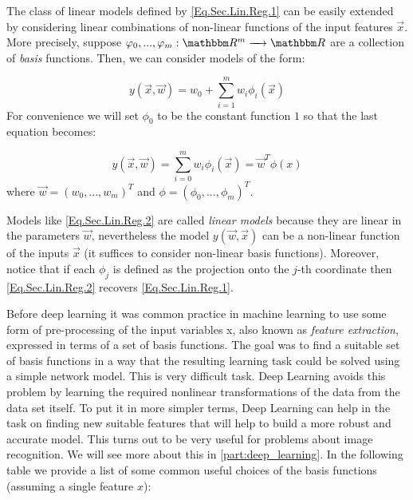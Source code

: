 The class of linear models defined by \cref{Eq.Sec.Lin.Reg.1} can be easily extended by considering linear combinations of non-linear functions of the input features $\vec{x}$. More precisely, suppose $\phi_0,...,\phi_m : \RR^m \lto \RR$ are a collection of \emph{basis} functions. Then, we can consider models of the form: 

\[ y(\vec{x},\vec{w}) = w_0 + \sum_{i=1}^{m}w_i\phi_i(\vec{x})\]
For convenience we will set $\phi_0$ to be the constant function $1$ so that the last equation becomes: 

\begin{equation}\label{Eq.Sec.Lin.Reg.2}
	y(\vec{x},\vec{w}) = \sum_{i=0}^{m}w_i\phi_i(\vec{x}) = \vec{w}^T\phi(x)
\end{equation}
where $\vec{w} = (w_0,...,w_m)^T$ and $\phi = (\phi_0,...,\phi_m)^T$.

\begin{remark}
	Models like \cref{Eq.Sec.Lin.Reg.2} are called \emph{linear models} because they are linear in the parameters $\vec{w}$, nevertheless the model $y(\vec{w},\vec{x})$ can be a non-linear function of the inputs $\vec{x}$ (it suffices to consider non-linear basis functions). Moreover, notice that if each $\phi_j$ is defined as the projection onto the $j$-th coordinate then \cref{Eq.Sec.Lin.Reg.2} recovers \cref{Eq.Sec.Lin.Reg.1}. 
\end{remark}

Before deep learning it was common practice in machine learning to use some form of pre-processing of the input variables x, also known as \emph{feature extraction}, expressed in terms of a set of basis functions. The goal was to find a suitable set of basis functions in a way that the resulting learning task could be solved using a simple network model. This is very difficult task. Deep Learning avoids this problem by learning the required nonlinear transformations of
the data from the data set itself. To put it in more simpler terms, Deep Learning can help in the task on finding new suitable features that will help to build a more robust and accurate model. This turns out to be very useful for problems about image recognition. We will see more about this in \cref{part:deep_learning}. 
In the following table we provide a list of some common useful choices of the basis functions (assuming a single feature $x$): 

